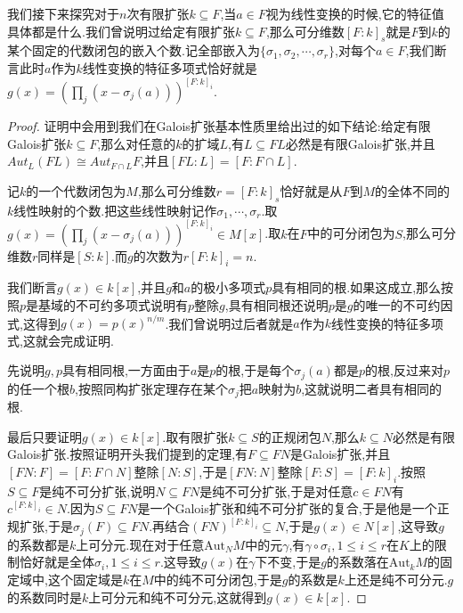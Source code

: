 我们接下来探究对于$n$次有限扩张$k\subseteq F$,当$a\in F$视为线性变换的时候,它的特征值具体都是什么.我们曾说明过给定有限扩张$k\subseteq F$,那么可分维数$[F:k]_s$就是$F$到$k$的某个固定的代数闭包的嵌入个数.记全部嵌入为$\{\sigma_1,\sigma_2,\cdots,\sigma_r\}$,对每个$a\in F$,我们断言此时$a$作为$k$线性变换的特征多项式恰好就是$g(x)=\left(\prod_j(x-\sigma_j(a))\right)^{[F:k]_i}$.
\begin{proof}
	
	证明中会用到我们在Galois扩张基本性质里给出过的如下结论:给定有限Galois扩张$k\subseteq F$,那么对任意的$k$的扩域$L$,有$L\subseteq FL$必然是有限Galois扩张,并且$Aut_L(FL)\cong Aut_{F\cap L}F$,并且$[FL:L]= [F:F\cap L]$.
	
	记$k$的一个代数闭包为$M$,那么可分维数$r=[F:k]_s$恰好就是从$F$到$M$的全体不同的$k$线性映射的个数.把这些线性映射记作$\sigma_1,\cdots,\sigma_r$.取$g(x)=\left(\prod_j(x-\sigma_j(a))\right)^{[F:k]_i}\in M[x]$.取$k$在$F$中的可分闭包为$S$,那么可分维数$r$同样是$[S:k]$.而$g$的次数为$r[F:k]_i=n$.
	
	我们断言$g(x)\in k[x]$,并且$g$和$a$的极小多项式$p$具有相同的根.如果这成立,那么按照$p$是基域的不可约多项式说明有$p$整除$g$,具有相同根还说明$p$是$g$的唯一的不可约因式,这得到$g(x)=p(x)^{n/m}$.我们曾说明过后者就是$a$作为$k$线性变换的特征多项式,这就会完成证明.
	
	先说明$g,p$具有相同根,一方面由于$a$是$p$的根,于是每个$\sigma_j(a)$都是$p$的根,反过来对$p$的任一个根$b$,按照同构扩张定理存在某个$\sigma_j$把$a$映射为$b$,这就说明二者具有相同的根.	
	
	最后只要证明$g(x)\in k[x]$.取有限扩张$k\subseteq S$的正规闭包$N$,那么$k\subseteq N$必然是有限Galois扩张.按照证明开头我们提到的定理,有$F\subseteq FN$是Galois扩张,并且$[FN:F]=[F:F\cap N]$整除$[N:S]$,于是$[FN:N]$整除$[F:S]=[F:k]_i$.按照$S\subseteq F$是纯不可分扩张,说明$N\subseteq FN$是纯不可分扩张,于是对任意$c\in FN$有$c^{[F:k]_i}\in N$.因为$S\subseteq FN$是一个Galois扩张和纯不可分扩张的复合,于是他是一个正规扩张,于是$\sigma_j(F)\subseteq FN$.再结合$(FN)^{[F:k]_i}\subseteq N$,于是$g(x)\in N[x]$,这导致$g$的系数都是$k$上可分元.现在对于任意$\mathrm{Aut}_NM$中的元$\gamma$,有$\gamma\circ\sigma_i,1\le i\le r$在$K$上的限制恰好就是全体$\sigma_i,1\le i\le r$.这导致$g(x)$在$\gamma$下不变,于是$g$的系数落在$\mathrm{Aut}_kM$的固定域中,这个固定域是$k$在$M$中的纯不可分闭包,于是$g$的系数是$k$上还是纯不可分元.$g$的系数同时是$k$上可分元和纯不可分元,这就得到$g(x)\in k[x]$.
\end{proof}

